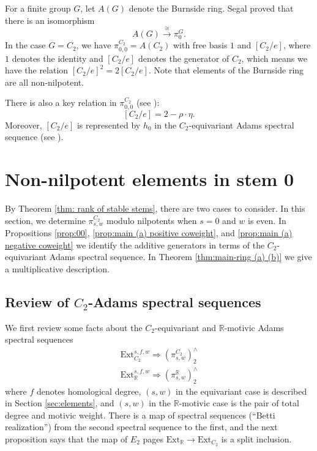 \documentclass[psamsfonts]{amsart}
\newcommand{\Ext}{\mathrm {Ext}}
\theoremstyle{definition}
\theoremstyle{remark}
\newcommand{\R}{\mathbb{R}}
\numberwithin{equation}{section}
\begin{document}
For a finite group $G$, let $A(G)$ denote the Burnside ring. Segal \cite{S}
proved that there is an isomorphism
\[A(G) \overset{\cong}{\to} \pi^G_{0}.\]
In the case $G=C_2$, we have $\pi^{C_2}_{0,0} = A(C_2)$  with free basis $1$ and $[C_2/e]$, where $1$ denotes the identity and $[C_2/e]$ denotes the generator of $C_2$, which means we have the relation $[C_2/e]^2=2[C_2/e]$. Note that elements of the Burnside ring are all non-nilpotent.

There is also a key relation in $\pi_{0,0}^{C_2}$ (see \cite[Lemma 10.9]{GHIR}):
\begin{equation}\label{eq:epsilon} [C_2/e]= 2 - \rho \cdot \eta. \end{equation}
Moreover, $[C_2/e]$ is represented by $h_0$ in the $C_2$-equivariant
Adams spectral sequence
(see \cite[Definition 11.6]{GHIR}).



\section{Non-nilpotent elements in stem 0} \label{sec:stem0}

By Theorem \ref{thm: rank of stable stems}, there are two cases to consider. In this section, we determine $\pi^{C_2}_{s,w}$ modulo nilpotents when $s=0$ and $w$ is even. In Propositions \ref{prop:00}, \ref{prop:main (a) positive coweight}, and \ref{prop:main (a) negative coweight}
we identify the additive generators in terms of the $C_2$-equivariant Adams spectral sequence. In Theorem \ref{thm:main-ring (a) (b)} we give a multiplicative description.

\subsection{Review of $C_2$-Adams spectral sequences} We first review some facts
about the $C_2$-equivariant and $\R$-motivic Adams spectral sequences
\begin{align*}
\Ext_{C_2}^{s,f,w} \Rightarrow (\pi_{s,w}^{C_2})^\wedge_2
\\\Ext_{\R}^{s,f,w}\Rightarrow (\pi_{s,w}^\R)^\wedge_2
\end{align*}
where $f$ denotes homological degree, $(s,w)$ in the equivariant case is described in Section \ref{sec:elements}, and $(s,w)$ in the $\R$-motivic case is the pair of total degree and motivic weight.
There is a map of spectral sequences (``Betti realization'') from the second
spectral sequence to the first, and the next proposition says that the map of $E_2$ pages
$\Ext_\R \to \Ext_{C_2}$ is a split inclusion.
\end{document}
